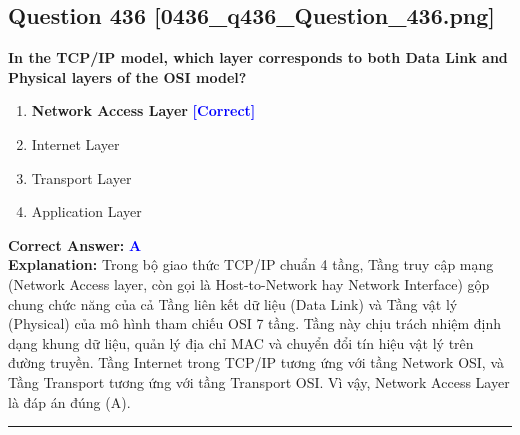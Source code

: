 \documentclass[11pt,a4paper]{article}
\begin{document}
\begin{minipage}{\textwidth}
\subsection*{Question 436 \quad \footnotesize{[0436\_q436\_Question\_436.png]}}
\noindent \textbf{In the TCP/IP model, which layer corresponds to both Data Link and Physical layers of the OSI model?}

\begin{enumerate}[label=\Alph*.]
    \item \textbf{Network Access Layer} \hfill \textcolor{blue}{\textbf{[Correct]}}
    \item Internet Layer
    \item Transport Layer
    \item Application Layer
\end{enumerate}

\noindent \textbf{Correct Answer:} \textcolor{blue}{\textbf{A}} \\[2pt]
\noindent \textbf{Explanation:} Trong bộ giao thức TCP/IP chuẩn 4 tầng, Tầng truy cập mạng (Network Access layer, còn gọi là Host-to-Network hay Network Interface) gộp chung chức năng của cả Tầng liên kết dữ liệu (Data Link) và Tầng vật lý (Physical) của mô hình tham chiếu OSI 7 tầng. Tầng này chịu trách nhiệm định dạng khung dữ liệu, quản lý địa chỉ MAC và chuyển đổi tín hiệu vật lý trên đường truyền. Tầng Internet trong TCP/IP tương ứng với tầng Network OSI, và Tầng Transport tương ứng với tầng Transport OSI. Vì vậy, Network Access Layer là đáp án đúng (A).

\par\vspace{0.3cm}
\hrule
\vspace{0.3cm}
\end{minipage}
\end{document}
